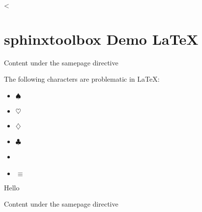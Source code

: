 \documentclass[letterpaper,10pt,english]{sphinxmanual}
\begin{document}
\sphinxstepscope<%


\chapter{sphinx\sphinxhyphen{}toolbox Demo \sphinxhyphen{} LaTeX}
\label{\detokenize{latex:sphinx-toolbox-demo-latex}}\label{\detokenize{latex::doc}}
\clearpage

\par\begin{samepage}

Content under the samepage directive

\begin{figure}[htbp]
\centering

\noindent{}
\end{figure}

\end{samepage}\par

\cleardoublepage

The \hspace{0pt}following \hspace{0pt}characters \hspace{0pt}are \hspace{0pt}problematic \hspace{0pt}in \hspace{0pt}LaTeX:
\begin{itemize}
\item {}
 $\spadesuit$

\item {}
 $\heartsuit$

\item {}
 $\diamondsuit$

\item {}
 $\clubsuit$

\item {}
\textmu{}

\item {}
 $\equiv$

\end{itemize}

\clearpage

Hello

\clearpage

\par\begin{samepage}

Content under the samepage directive

\begin{figure}[htbp]
\centering

\noindent{}
\end{figure}

\end{samepage}\par
\end{document}

